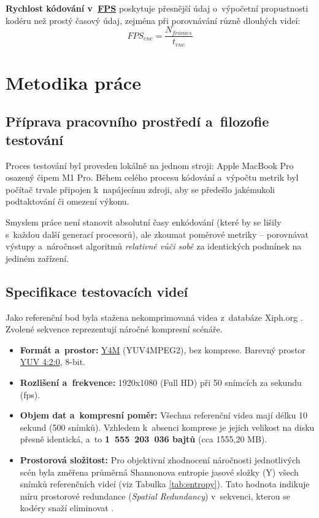 \documentclass[11pt,a4paper]{article}
\begin{document}
\textbf{Rychlost kódování v~\hyperref[sec:derived_metrics]{FPS}} poskytuje přesnější údaj o~výpočetní propustnosti kodéru než prostý časový údaj, zejména při porovnávání různě dlouhých videí:
\begin{equation*}
    FPS_{enc} = \frac{N_{frames}}{t_{enc}}
\end{equation*}

\section{Metodika práce}

\subsection*{Příprava pracovního prostředí a~filozofie testování}
Proces testování byl proveden lokálně na jednom stroji: Apple MacBook Pro osazený čipem M1 Pro. Během celého procesu kódování a~výpočtu metrik byl počítač trvale připojen k~napájecímu zdroji, aby se předešlo jakémukoli podtaktování či omezení výkonu.

Smyslem práce není stanovit absolutní časy enkódování (které by se lišily s~každou další generací procesorů), ale zkoumat poměrové metriky – porovnávat výstupy a~náročnost algoritmů \textit{relativně vůči sobě} za identických podmínek na jediném zařízení.

\subsection*{Specifikace testovacích videí}
Jako referenční bod byla stažena nekomprimovaná videa z~databáze Xiph.org \cite{xiphDerf}. Zvolené sekvence reprezentují náročné kompresní scénáře.
\begin{itemize}
    \item \textbf{Formát a~prostor:} \hyperref[sec:glossary]{Y4M} (YUV4MPEG2), bez komprese. Barevný prostor \hyperref[sec:glossary]{YUV 4:2:0}, 8-bit.
    \item \textbf{Rozlišení a~frekvence:} 1920x1080 (Full HD) při 50 snímcích za sekundu (fps).
    \item \textbf{Objem dat a~kompresní poměr:} Všechna referenční videa mají délku 10 sekund (500 snímků). Vzhledem k~absenci komprese je jejich velikost na disku přesně identická, a~to \textbf{1~555~203~036 bajtů} (cca 1555,20 MB).
    \item \textbf{Prostorová složitost:} Pro objektivní zhodnocení náročnosti jednotlivých scén byla změřena průměrná Shannonova entropie jasové složky (Y) všech snímků referenčních videí (viz Tabulka \ref{tab:entropy}). Tato hodnota indikuje míru prostorové redundance (\textit{Spatial Redundancy}) v~sekvenci, kterou se kodéry snaží eliminovat \cite{lec_tech}.
\end{itemize}
\end{document}
